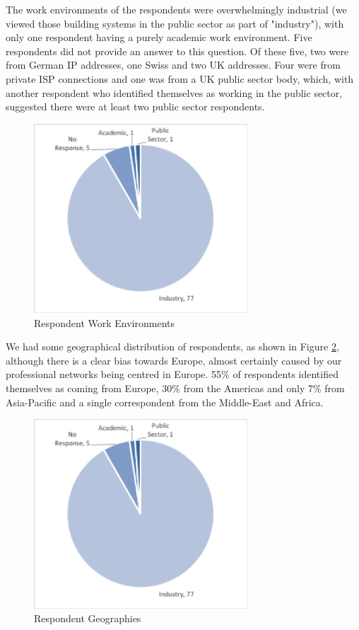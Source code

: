 The work environments of the respondents were overwhelmingly industrial (we viewed those building systems in the public sector as part of "industry"), with only one respondent having a purely academic work environment.  Five respondents did not provide an answer to this question.  Of these five, two were from German IP addresses, one Swiss and two UK addresses.  Four were from private ISP connections and one was from a UK public sector body, which, with another respondent who identified themselves as working in the public sector, suggested there were at least two public sector respondents.
 
\begin{figure}
\centering
\includegraphics[width=8cm,trim={2 2 2 2},clip]{Figures/prioritisation-workenv}
\caption{Respondent Work Environments}
\label{figure:workenvs}
\end{figure}

We had some geographical distribution of respondents, as shown in Figure \ref{figure:geographies}, although there is a clear bias towards Europe, almost certainly caused by our professional networks being centred in Europe.  55\% of respondents identified themselves as coming from Europe, 30\% from the Americas and only 7\% from Asia-Pacific and a single correspondent from the Middle-East and Africa.

\begin{figure}
\centering
\includegraphics[width=8cm,trim={2 2 2 2},clip]{Figures/prioritisation-workenv}
\caption{Respondent Geographies}
\label{figure:geographies}
\end{figure}

